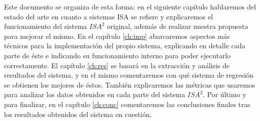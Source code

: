 Este documento se organiza de esta forma: en el siguiente capítulo hablaremos del estado del arte en cuanto a sistemas \ac{ISA} se refiere y explicaremos el funcionamiento del sistema $ISA^{2}$ original, además de realizar nuestra propuesta para mejorar el mismo. En el capítulo \ref{ch:imp} abarcaremos aspectos más técnicos para la implementación del propio sistema, explicando en detalle cada parte de éste e indicando su funcionamiento interno para poder ejecutarlo correctamente. El capítulo \ref{ch:res} se basará en la extracción y análisis de resultados del sistema, y en el mismo comentaremos con qué sistema de regresión se obtienen los mejores de éstos. También explicaremos las métricas que usaremos para analizar los datos obtenidos en cada parte del sistema $ISA^{2}$. Por último y para finalizar, en el capítulo \ref{ch:conc} comentaremos las conclusiones finales tras los resultados obtenidos del sistema en cuestión.




